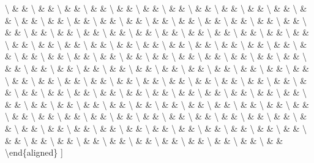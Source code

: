 \documentclass[
]{article}
\begin{document}
{\textbackslash{} \& \& \textbackslash{} \& \& \textbackslash{} \& \&
\textbackslash{} \& \& \textbackslash{} \& \& \textbackslash{} \& \&
\textbackslash{} \& \& \textbackslash{} \& \& \textbackslash{} \& \&
\textbackslash{} \& \& \textbackslash{} \& \& \textbackslash{} \& \&
\textbackslash{} \& \& \textbackslash{} \& \& \textbackslash{} \& \&
\textbackslash{} \& \& \textbackslash{} \& \& \textbackslash{} \& \&
\textbackslash{} \& \& \textbackslash{} \& \& \textbackslash{} \& \&
\textbackslash{} \& \& \textbackslash{} \& \& \textbackslash{} \& \&
\textbackslash{} \& \& \textbackslash{} \& \& \textbackslash{} \& \&
\textbackslash{} \& \& \textbackslash{} \& \& \textbackslash{} \& \&
\textbackslash{} \& \& \textbackslash{} \& \& \textbackslash{} \& \&
\textbackslash{} \& \& \textbackslash{} \& \& \textbackslash{} \& \&
\textbackslash{} \& \& \textbackslash{} \& \& \textbackslash{} \& \&
\textbackslash{} \& \& \textbackslash{} \& \& \textbackslash{} \& \&
\textbackslash{} \& \& \textbackslash{} \& \& \textbackslash{} \& \&
\textbackslash{} \& \& \textbackslash{} \& \& \textbackslash{} \& \&
\textbackslash{} \& \& \textbackslash{} \& \& \textbackslash{} \& \&
\textbackslash{} \& \& \textbackslash{} \& \& \textbackslash{} \& \&
\textbackslash{} \& \& \textbackslash{} \& \& \textbackslash{} \& \&
\textbackslash{} \& \& \textbackslash{} \& \& \textbackslash{} \& \&
\textbackslash{} \& \& \textbackslash{} \& \& \textbackslash{} \& \&
\textbackslash{} \& \& \textbackslash{} \& \& \textbackslash{} \& \&
\textbackslash{} \& \& \textbackslash{} \& \& \textbackslash{} \& \&
\textbackslash{} \& \& \textbackslash{} \& \& \textbackslash{} \& \&
\textbackslash{} \& \& \textbackslash{} \& \& \textbackslash{} \& \&
\textbackslash{} \& \& \textbackslash{} \& \& \textbackslash{} \& \&
\textbackslash{} \& \& \textbackslash{} \& \& \textbackslash{} \& \&
\textbackslash{} \& \& \textbackslash{} \& \& \textbackslash{} \& \&
\textbackslash{} \& \& \textbackslash{} \& \& \textbackslash{} \& \&
\textbackslash{} \& \& \textbackslash{} \& \& \textbackslash{} \& \&
\textbackslash{} \& \& \textbackslash{} \& \& \textbackslash{} \& \&
\textbackslash{} \& \& \textbackslash{} \& \& \textbackslash{} \& \&
\textbackslash{} \& \& \textbackslash{} \& \& \textbackslash{} \& \&
\textbackslash{} \& \& \textbackslash{} \& \& \textbackslash{} \& \&
\textbackslash{} \& \& \textbackslash{} \& \& \textbackslash{} \& \&
\textbackslash{} \& \& \textbackslash{} \& \& \textbackslash{} \& \&
\textbackslash{} \& \& \textbackslash{} \& \& \textbackslash{} \& \&
\textbackslash{} \& \& \textbackslash{} \& \& \textbackslash{} \& \&
\textbackslash{} \& \& \textbackslash{} \& \& \textbackslash{} \& \&
\textbackslash{} \& \& \textbackslash{} \& \& \textbackslash{} \& \&
\textbackslash{} \& \& \textbackslash{} \& \& \textbackslash{} \& \&
\textbackslash{} \& \& \textbackslash{} \& \& \textbackslash{} \& \&
\textbackslash{} \& \& \textbackslash{} \& \& \textbackslash{} \& \&
\textbackslash{} \& \& \textbackslash{} \& \& \textbackslash{} \& \&
\textbackslash{} \& \& \textbackslash{} \& \& \textbackslash{} \& \&
\textbackslash{} \& \& \textbackslash{} \& \& \textbackslash{} \& \&
\textbackslash{} \& \& \textbackslash end\{aligned\} {]}

}
\end{document}
